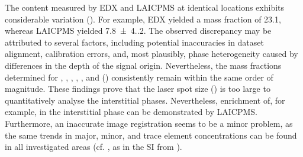 The  content measured by \ac{EDX} and \ac{LAICPMS} at identical locations exhibits considerable variation ().
For example, \ac{EDX} yielded a mass fraction of \qty{23.1}{\wtpercent}, whereas \ac{LAICPMS} yielded \qty{7.8(4.2)}{\wtpercent}.
The observed discrepancy may be attributed to several factors, including potential inaccuracies in dataset alignment, calibration errors, and, most plausibly, phase heterogeneity caused by differences in the depth of the signal origin.
Nevertheless, the mass fractions determined for , , , , , and  () consistently remain within the same order of magnitude.
These findings prove that the laser spot size () is too large to quantitatively analyse the interstitial phases.
Nevertheless, enrichment of, for example,  in the interstitial phase can be demonstrated by \ac{LAICPMS}.
Furthermore, an inaccurate image registration seems to be a minor problem, as the same trends in major, minor, and trace element concentrations can be found in all investigated areas (cf. , as in the \ac{SI} from \cite{kleiner.2022b}).

